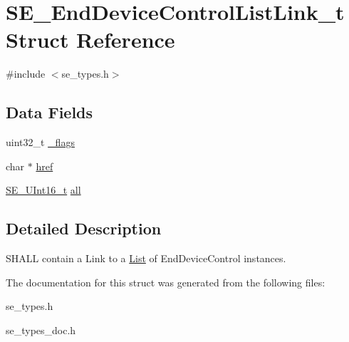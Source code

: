\hypertarget{structSE__EndDeviceControlListLink__t}{}\section{S\+E\+\_\+\+End\+Device\+Control\+List\+Link\+\_\+t Struct Reference}
\label{structSE__EndDeviceControlListLink__t}


{\ttfamily \#include $<$se\+\_\+types.\+h$>$}

\subsection*{Data Fields}
\begin{DoxyCompactItemize}
\item 
uint32\+\_\+t \hyperlink{group__EndDeviceControlListLink_gac8b545f4be968f1fc37a72590fc41aee}{\+\_\+flags}
\item 
char $\ast$ \hyperlink{group__EndDeviceControlListLink_gad0d8d1cc17c6e6bc8ccc865b312ace64}{href}
\item 
\hyperlink{group__UInt16_gac68d541f189538bfd30cfaa712d20d29}{S\+E\+\_\+\+U\+Int16\+\_\+t} \hyperlink{group__EndDeviceControlListLink_ga656a30b9a25ba0e7c4a900517700b30b}{all}
\end{DoxyCompactItemize}


\subsection{Detailed Description}
S\+H\+A\+LL contain a Link to a \hyperlink{structList}{List} of End\+Device\+Control instances. 

The documentation for this struct was generated from the following files\+:\begin{DoxyCompactItemize}
\item 
se\+\_\+types.\+h\item 
se\+\_\+types\+\_\+doc.\+h\end{DoxyCompactItemize}

